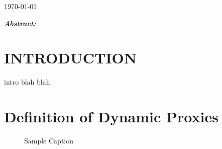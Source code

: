 \documentclass[10pt, onecolumn]{witseiepaper}
\begin{document}
\begin{titlepage}
\begin{center}
				
		{\large \today}\\[1.25cm]
				
					
		 \begin{minipage}
		 	{1	\textwidth} 
		 	\begin{flushleft}
		 	
		 	\large \emph{\textbf{Abstract:}}\\
		  			 			 	
		  	\end{flushleft}
		 \end{minipage}
	\end{center}

\end{titlepage}	
	

\tableofcontents


\section{INTRODUCTION}

intro blah blah \cite{Java}



\section{Definition of Dynamic Proxies}

\begin{figure}[h]
	\centering
	\caption{Sample Caption}
	\label{SampleLabel}
\end{figure}
\end{document}
